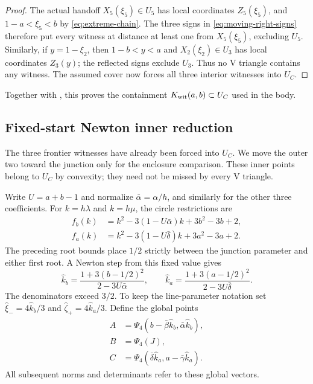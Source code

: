 \begin{proof}
The actual handoff $X_5(\xi_5)\in U_5$ has local coordinates
$Z_5(\xi_5)$, and
$1-a<\xi_5<b$ by \eqref{eq:extreme-chain}.  The three signs in
\eqref{eq:moving-right-signs} therefore put every witness at distance at
least one from $X_5(\xi_5)$, excluding $U_5$.  Similarly, if $y=1-\xi_2$, then
$1-b<y<a$ and $X_2(\xi_2)\in U_3$ has local coordinates $Z_3(y)$;
the reflected signs exclude $U_3$.
Thus no V triangle contains any witness.  The assumed cover now forces all
three interior witnesses into $U_C$.
\end{proof}

Together with , this proves the
containment $K_{\rm wit}(a,b)\subset U_C$ used in the body.

\subsection{Fixed-start Newton inner reduction}

The three frontier witnesses have already been forced into $U_C$.
We move the outer two toward the junction only for the enclosure
comparison.  These inner points belong to $U_C$ by convexity; they need
not be missed by every V triangle.

Write $U=a+b-1$ and normalize
$\bar\alpha=\alpha/h$, and similarly for the other three coefficients.
For $k=h\lambda$ and $k=h\mu$, the circle restrictions are
\[
 \begin{aligned}
 f_b(k)&=k^2-3(1-U\bar\alpha)k+3b^2-3b+2,\\
 f_a(k)&=k^2-3(1-U\bar\delta)k+3a^2-3a+2.
 \end{aligned}
\]
The preceding root bounds place $1/2$ strictly between the junction
parameter and either first root.  A Newton step from this fixed value gives
\[
 \widehat k_b=\frac{1+3(b-1/2)^2}{2-3U\bar\alpha},\qquad
 \widehat k_a=\frac{1+3(a-1/2)^2}{2-3U\bar\delta}.
\]
The denominators exceed $3/2$.  To keep the line-parameter notation set
$\widehat\xi_-=4\widehat k_b/3$ and
$\widehat\zeta_+=4\widehat k_a/3$.  Define the global points
\[
 \begin{aligned}
 A&=\Psi_4(b-\bar\beta\widehat k_b,
                     \bar\alpha\widehat k_b),\\
 B&=\Psi_4(J),\\
 C&=\Psi_4(\bar\delta\widehat k_a,
                     a-\bar\gamma\widehat k_a).
 \end{aligned}
\]
All subsequent norms and determinants refer to these global vectors.

